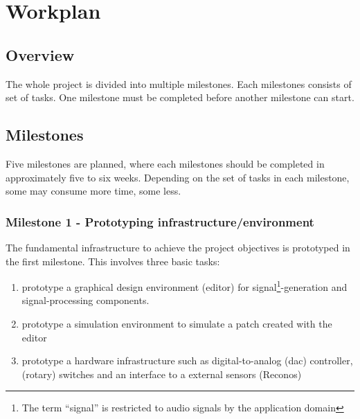
\chapter{Workplan}
\label{chapter:Workplan}

\section{Overview}


The whole project is divided into multiple milestones. Each milestones consists of set of tasks. One milestone must be completed before another milestone can start.

\section{Milestones}

Five milestones are planned, where each milestones should be completed in approximately five to six weeks. Depending on the set of tasks in each milestone, some may consume more time, some less.

\subsection{Milestone 1 - Prototyping infrastructure/environment}

The fundamental infrastructure to achieve the project objectives is prototyped in the first milestone. This involves three basic tasks:

\begin{enumerate}
	\item prototype a graphical design environment (editor) for signal\footnote{The term "`signal"' is restricted to audio signals by the application domain}-generation and signal-processing components. 
	\item prototype a simulation environment to simulate a patch created with the editor
	\item prototype a hardware infrastructure such as digital-to-analog (dac) controller, (rotary) switches and an interface to a external sensors (Reconos)
\end{enumerate}


